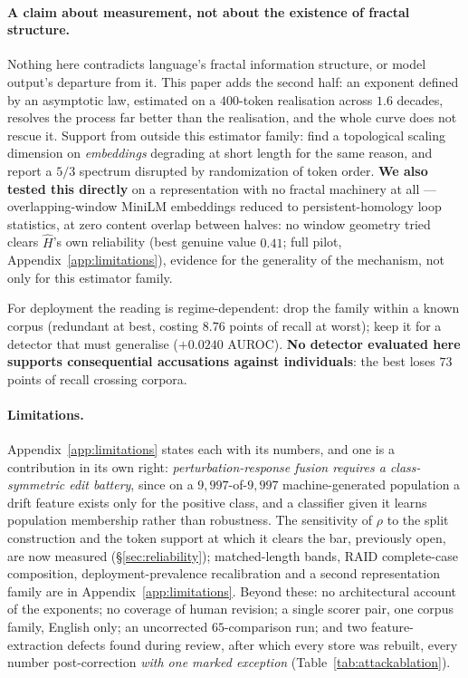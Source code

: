 \documentclass{article}
\newcommand{\Hest}{\ensuremath{\widehat{H}}}
\begin{document}
\paragraph{A claim about measurement, not about the existence of fractal structure.}
Nothing here contradicts language's fractal information structure, or model
output's departure from it. This paper adds the second half: an exponent
defined by an asymptotic law, estimated on a $400$-token realisation across
$1.6$ decades, resolves the process far better than the realisation, and the
whole curve does not rescue it. Support from outside this estimator family:
\citet{wei2025shortphd} find a topological scaling dimension on
\emph{embeddings} degrading at short length for the same reason, and
\citet{yang2026turbulence} report a $5/3$ spectrum disrupted by
randomization of token order. \textbf{We also tested this directly} on a
representation with no fractal machinery at all --- overlapping-window
MiniLM embeddings reduced to persistent-homology loop statistics, at zero
content overlap between halves: no window geometry tried clears \Hest's own
reliability (best genuine value $0.41$; full pilot,
Appendix~\ref{app:limitations}), evidence for the generality of the
mechanism, not only for this estimator family.

For deployment the reading is regime-dependent: drop the family within a
known corpus (redundant at best, costing $8.76$ points of recall at worst);
keep it for a detector that must generalise ($+0.0240$ AUROC).
\textbf{No detector evaluated here supports consequential accusations
against individuals}: the best loses $73$ points of recall crossing corpora.

\paragraph{Limitations.}
Appendix~\ref{app:limitations} states each with its numbers, and one is a
contribution in its own right: \emph{perturbation-response fusion requires a
class-symmetric edit battery}, since on a $9{,}997$-of-$9{,}997$
machine-generated population a drift feature exists only for the positive
class, and a classifier given it learns population membership rather than
robustness. The sensitivity of $\rho$ to the split construction and the
token support at which it clears the bar, previously open, are now measured
(\S\ref{sec:reliability}); matched-length bands, RAID complete-case
composition, deployment-prevalence recalibration and a second representation
family are in Appendix~\ref{app:limitations}. Beyond these: no architectural
account of the exponents; no coverage of human revision; a single scorer
pair, one corpus family, English only; an uncorrected $65$-comparison run;
and two feature-extraction defects found during review, after which every
store was rebuilt, every number post-correction \emph{with one marked
exception} (Table~\ref{tab:attackablation}).
\end{document}
